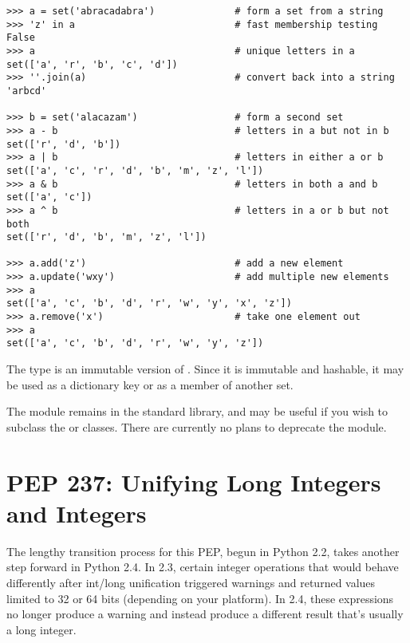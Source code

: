 \documentclass{howto}
\begin{document}
\begin{verbatim}
>>> a = set('abracadabra')              # form a set from a string
>>> 'z' in a                            # fast membership testing
False
>>> a                                   # unique letters in a
set(['a', 'r', 'b', 'c', 'd'])
>>> ''.join(a)                          # convert back into a string
'arbcd'

>>> b = set('alacazam')                 # form a second set
>>> a - b                               # letters in a but not in b
set(['r', 'd', 'b'])
>>> a | b                               # letters in either a or b
set(['a', 'c', 'r', 'd', 'b', 'm', 'z', 'l'])
>>> a & b                               # letters in both a and b
set(['a', 'c'])
>>> a ^ b                               # letters in a or b but not both
set(['r', 'd', 'b', 'm', 'z', 'l'])

>>> a.add('z')                          # add a new element
>>> a.update('wxy')                     # add multiple new elements
>>> a
set(['a', 'c', 'b', 'd', 'r', 'w', 'y', 'x', 'z'])       
>>> a.remove('x')                       # take one element out
>>> a
set(['a', 'c', 'b', 'd', 'r', 'w', 'y', 'z'])       
\end{verbatim}

The  type is an immutable version of .
Since it is immutable and hashable, it may be used as a dictionary key or
as a member of another set.  

The  module remains in the standard library, and may be
useful if you wish to subclass the  or 
classes.  There are currently no plans to deprecate the module.

\begin{seealso}
\end{seealso}

\section{PEP 237: Unifying Long Integers and Integers}

The lengthy transition process for this PEP, begun in Python 2.2,
takes another step forward in Python 2.4.  In 2.3, certain integer
operations that would behave differently after int/long unification
triggered  warnings and returned values
limited to 32 or 64 bits (depending on your platform).  In 2.4, these
expressions no longer produce a warning and instead produce a
different result that's usually a long integer.
\end{document}
